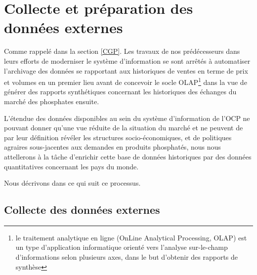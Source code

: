 	\section{Collecte et préparation des données externes}
	Comme rappelé dans la section \ref{CGP}. Les travaux de nos prédécesseurs dans leurs efforts de moderniser le système d'information se sont arrêtés à automatiser l'archivage des données se rapportant aux historiques de ventes en terme de prix et volumes en un premier lieu\cite{CHEMLAL} avant de concevoir le socle OLAP\footnote{le traitement analytique en ligne (OnLine Analytical Processing, OLAP) est un type d'application informatique orienté vers l'analyse sur-le-champ d'informations selon plusieurs axes, dans le but d'obtenir des rapports de synthèse} dans la vue de générer des rapports synthétiques concernant les historiques des échanges du marché des phosphates ensuite\cite{NACER}.
	\par
	L'étendue des données disponibles au sein du système d'information de l'OCP ne pouvant donner qu'une vue réduite de la situation du marché et ne peuvent de par leur définition révéler les structures socio-économiques,  et de politiques agraires sous-jacentes aux demandes en produits phosphatés, nous nous attellerons à la tâche d'enrichir cette base de données historiques par des données quantitatives concernant les pays du monde.
	\par
	Nous décrivons dans ce qui suit ce processus. 
	\subsection{Collecte des données externes}
